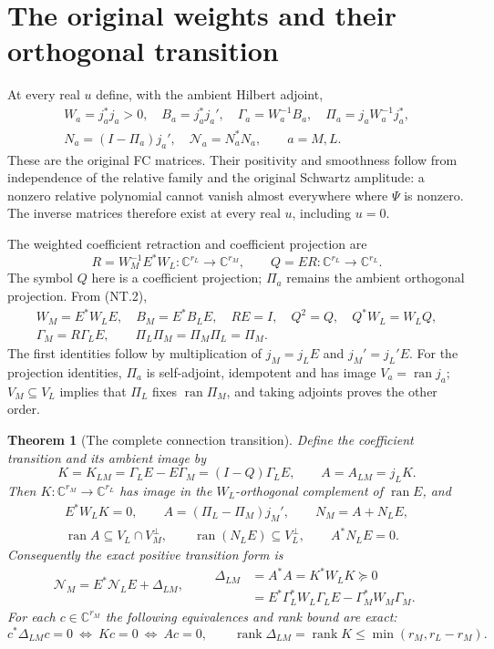 \documentclass[11pt]{article}
\newtheorem{theorem}{Theorem}
\newcommand{\ran}{\operatorname{ran}}
\newcommand{\rank}{\operatorname{rank}}
\begin{document}
\section{The original weights and their orthogonal transition}

At every real $u$ define, with the ambient Hilbert adjoint,
\[
 \begin{gathered}
 W_a=j_a^*j_a>0,\quad B_a=j_a^*j_a',\quad
 \Gamma_a=W_a^{-1}B_a,\quad
 \Pi_a=j_aW_a^{-1}j_a^*,\\
 N_a=(I-\Pi_a)j_a',\quad \mathcal N_a=N_a^*N_a,
 \qquad a=M,L.
 \end{gathered}
 \tag{NT.5}
\]
These are the original FC matrices. Their positivity and smoothness
follow from independence of the relative family and the original
Schwartz amplitude: a nonzero relative polynomial cannot vanish
almost everywhere where $\Psi$ is nonzero. The inverse matrices
therefore exist at every real $u$, including $u=0$.

The weighted coefficient retraction and coefficient projection are
\[
 R=W_M^{-1}E^*W_L:\mathbb C^{r_L}\to\mathbb C^{r_M},\qquad
 Q=ER:\mathbb C^{r_L}\to\mathbb C^{r_L}.
 \tag{NT.6}
\]
The symbol $Q$ here is a coefficient projection; $\Pi_a$ remains
the ambient orthogonal projection. From (NT.2),
\[
 \begin{gathered}
 W_M=E^*W_LE,\quad B_M=E^*B_LE,\quad
 R E=I,\quad Q^2=Q,\quad Q^*W_L=W_LQ,\\
 \Gamma_M=R\Gamma_LE,\qquad
 \Pi_L\Pi_M=\Pi_M\Pi_L=\Pi_M.
 \end{gathered}
 \tag{NT.7}
\]
The first identities follow by multiplication of $j_M=j_LE$ and
$j_M'=j_L'E$. For the projection identities, $\Pi_a$ is
self-adjoint, idempotent and has image $V_a=\ran j_a$;
$V_M\subseteq V_L$ implies that $\Pi_L$ fixes $\ran\Pi_M$,
and taking adjoints proves the other order.

\begin{theorem}[The complete connection transition]
Define the coefficient transition and its ambient image by
\[
 K=K_{LM}=\Gamma_LE-E\Gamma_M=(I-Q)\Gamma_LE,
 \qquad A=A_{LM}=j_LK.
 \tag{NT.8}
\]
Then $K:\mathbb C^{r_M}\to\mathbb C^{r_L}$ has image in
the $W_L$-orthogonal complement of $\ran E$, and
\[
 \begin{gathered}
 E^*W_LK=0,\qquad
 A=(\Pi_L-\Pi_M)j_M',\qquad
 N_M=A+N_LE,\\
 \ran A\subseteq V_L\cap V_M^\perp,\qquad
 \ran(N_LE)\subseteq V_L^\perp,\qquad A^*N_LE=0.
 \end{gathered}
 \tag{NT.9}
\]
Consequently the exact positive transition form is
\[
 \boxed{\mathcal N_M=E^*\mathcal N_LE+\Delta_{LM}},\qquad
 \begin{aligned}
 \Delta_{LM}&=A^*A=K^*W_LK\succeq0\\
 &=E^*\Gamma_L^*W_L\Gamma_LE
                           -\Gamma_M^*W_M\Gamma_M.
 \end{aligned}
 \tag{NT.10}
\]
For each $c\in\mathbb C^{r_M}$ the following equivalences and
rank bound are exact:
\[
 c^*\Delta_{LM}c=0\ \Longleftrightarrow\ Kc=0
 \ \Longleftrightarrow\ Ac=0,\qquad
 \rank\Delta_{LM}=\rank K\le\min(r_M,r_L-r_M).
 \tag{NT.11}
\]
\end{theorem}
\end{document}
